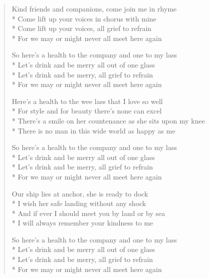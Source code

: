 \documentclass[9pt,twoside]{extarticle}
\newenvironment{xverse}{
	\begin{verse}
	\fontsize{8.5}{10.5}\selectfont
	}
	{
	\end{verse}
	\penalty 0
}
\begin{document}
\begin{xverse}
Kind friends and companions, come join me in rhyme \\*
Come lift up your voices in chorus with mine \\*
Come lift up your voices, all grief to refrain \\*
For we may or might never all meet here again

So here’s a health to the company and one to my lass \\*
Let’s drink and be merry all out of one glass \\*
Let’s drink and be merry, all grief to refrain \\*
For we may or might never all meet here again

Here’s a health to the wee lass that I love so well \\*
For style and for beauty there’s none can excel \\*
There’s a smile on her countenance as she sits upon my knee \\*
There is no man in this wide world as happy as me

So here’s a health to the company and one to my lass \\*
Let’s drink and be merry all out of one glass \\*
Let’s drink and be merry, all grief to refrain \\*
For we may or might never all meet here again

Our ship lies at anchor, she is ready to dock \\*
I wish her safe landing without any shock \\*
And if ever I should meet you by land or by sea \\*
I will always remember your kindness to me

So here’s a health to the company and one to my lass \\*
Let’s drink and be merry all out of one glass \\*
Let’s drink and be merry, all grief to refrain \\*
For we may or might never all meet here again
\end{xverse}

\end{document}
